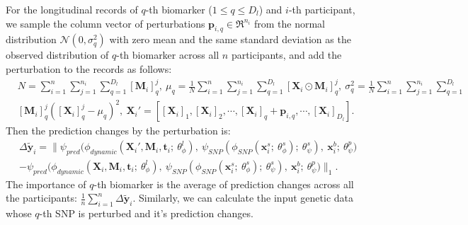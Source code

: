 For the longitudinal records of $q$-th biomarker ($1 \leq q \leq D_l$) and $i$-th participant, we sample the column vector of perturbations $\mathbf{p}_{i,q} \in \Re^{n_i}$ from the normal distribution $\mathcal{N}(0, \sigma_q^2)$ with zero mean and the same standard deviation as the observed distribution of $q$-th biomarker across all $n$ participants, and add the perturbation to the records as follows:
\begin{equation}
\begin{aligned}
    &N = \sum_{i=1}^n \sum_{j=1}^{n_i} \sum_{q=1}^{D_l} [\mathbf{M}_i]^j_q,\ \mu_q = \frac{1}{N}\sum_{i=1}^n \sum_{j=1}^{n_i} \sum_{q=1}^{D_l} [\mathbf{X}_i \odot \mathbf{M}_i]^j_q,\ \sigma_q^2 = \frac{1}{N}\sum_{i=1}^n \sum_{j=1}^{n_i} \sum_{q=1}^{D_l}\\
    &[\mathbf{M}_i]^j_q ([\mathbf{X}_i]^j_q - \mu_q)^2,\ \mathbf{X}_i' = [[\mathbf{X}_i]_1, [\mathbf{X}_i]_2, \cdots, [\mathbf{X}_i]_q + \mathbf{p}_{i, q}, \cdots, [\mathbf{X}_i]_{D_l}].
\end{aligned}
\end{equation}
Then the prediction changes by the perturbation is:
\begin{equation}\label{eq: neuroimaging identification}
\begin{aligned}
    &\Delta\tilde{\mathbf{y}}_i = \| \psi_{pred}\bigl(\phi_{dynamic}(\mathbf{X}_i', \mathbf{M}_i, \mathbf{t}_i;\ \theta_{\phi}^l),\ \psi_{SNP}(\phi_{SNP}(\mathbf{x}_i^s;\ \theta^s_{\phi});\ \theta^s_{\psi}),\ \mathbf{x}_i^b;\ \theta^p_{\psi}\bigr)\\
    &- \psi_{pred}\bigl(\phi_{dynamic}(\mathbf{X}_i, \mathbf{M}_i, \mathbf{t}_i;\ \theta_{\phi}^l),\ \psi_{SNP}(\phi_{SNP}(\mathbf{x}_i^s;\ \theta^s_{\phi});\ \theta^s_{\psi}),\ \mathbf{x}_i^b;\ \theta^p_{\psi}\bigr)\|_1.
\end{aligned}
\end{equation}
The importance of $q$-th biomarker is the average of prediction changes across all the participants: $\frac{1}{n}\sum_{i=1}^n\Delta\tilde{\mathbf{y}}_i$. Similarly, we can calculate the input genetic data whose $q$-th SNP is perturbed and it's prediction changes.
